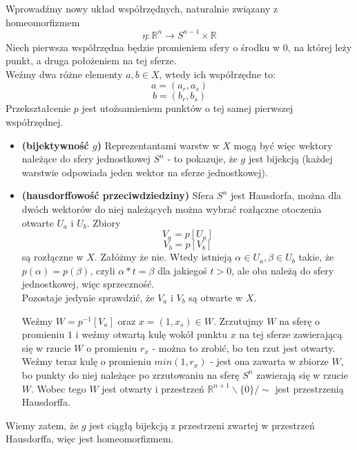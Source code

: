 Wprowadźmy nowy układ współrzędnych, naturalnie związany z homeomorfizmem 
$$
\eta : \mathbb{R}^n \rightarrow S^{n-1} \times \mathbb{R}
$$
Niech pierwsza współrzędna będzie promieniem sfery o środku w $0$, na której leży punkt, a druga położeniem na tej sferze. \\
Weźmy dwa różne elementy $ a, b \in X $, wtedy ich współrzędne to:
$$
a = (a_r, a_s)
$$
$$
b = (b_r, b_s)
$$
Przekształcenie $p$ jest utożsamieniem punktów o tej samej pierwszej współrzędnej.
\begin{itemize}
\item \textbf{(bijektywność $g$)} Reprezentantami warstw w $X$ mogą być więc wektory należące do sfery jednostkowej $S^n$ - to pokazuje, że $g$ jest bijekcją (każdej warstwie odpowiada jeden wektor na sferze jednostkowej).
\item \textbf{(hausdorffowość przeciwdziedziny)} Sfera $S^n$ jest Hausdorfa, można dla dwóch wektorów do niej należących można wybrać rozłączne otoczenia otwarte $U_a$ i $U_b$.
Zbiory
$$
V_a = p[U_a]
$$
$$
V_b = p[V_b]
$$
są rozłączne w $X$. Załóżmy że nie. Wtedy istnieją $ \alpha \in U_a, \beta \in U_b $ takie, że $ p(\alpha) = p(\beta) $, czyli $\alpha * t = \beta$ dla jakiegoś $t > 0$, ale oba należą do sfery jednostkowej, więc sprzeczność.\\
Pozostaje jedynie sprawdzić, że $V_a$ i $V_b$ są otwarte w $X$.

Weźmy $ W = p^{-1}[V_a] $ oraz $ x = (1, x_s) \in W $. Zrzutujmy $W$ na sferę o promieniu $1$ i weźmy otwartą kulę wokół punktu $x$ na tej sferze zawierającą się w rzucie $W$ o promieniu $r_x$ - można to zrobić, bo ten rzut jest otwarty. \\
Weźmy teraz kulę o promieniu $min(1, r_x)$ - jest ona zawarta w zbiorze $W$, bo punkty do niej należące po zrzutowaniu na sferę $S^n$ zawierają się w rzucie $W$. Wobec tego $W$ jest otwarty i przestrzeń  $\mathbb{R}^{n+1} \backslash \{0\} / \sim$  jest przestrzenią Hausdorffa.
\end{itemize}

Wiemy zatem, że $g$ jest ciągłą bijekcją z przestrzeni zwartej w przestrzeń Hausdorffa, więc jest homeomorfizmem.
